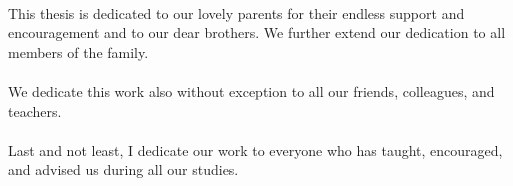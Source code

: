 \begin{Dedications}
\paragraph{}

This thesis is dedicated to our lovely parents for their endless support and encouragement and to our dear brothers. We further extend our dedication to all members of the family. 
\paragraph{}
We dedicate this work also without exception to all our friends, colleagues, and teachers. 
\paragraph{}
Last and not least, I dedicate our work to everyone who has taught, encouraged, and advised us during all our studies. 

\end{Dedications}